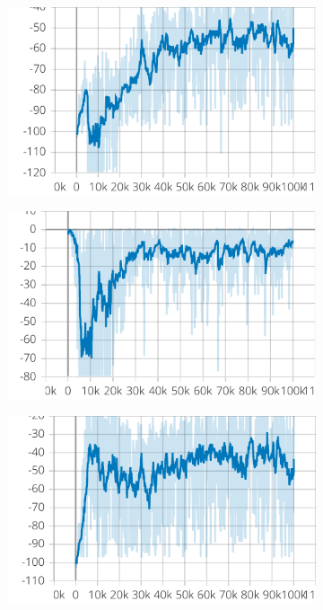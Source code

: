 \documentclass[12pt,a4paper,openright,twoside]{book}
\begin{document}
    \begin{figure}[t]
        \centering
        \begin{subfigure}[b]{0.32\textwidth}
            \centering
            \includegraphics[width=\textwidth]{figures/reward-ctde.pdf}
        \end{subfigure}
        \hfill
        \begin{subfigure}[b]{0.32\textwidth}
            \centering
            \includegraphics[width=\textwidth]{figures/collision-ctde.pdf}
        \end{subfigure}
        \hfill
        \begin{subfigure}[b]{0.32\textwidth}
            \centering
            \includegraphics[width=\textwidth]{figures/cohesion-ctde.pdf}

\end{subfigure}
\end{figure}
\end{document}
